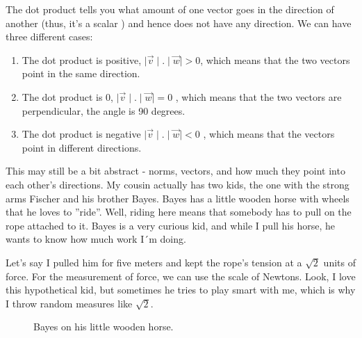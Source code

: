 \documentclass[600paper, 11pt,twoside,openany]{kdp}
\begin{document}
\indent The dot product tells you what amount of one vector goes in the direction of another (thus, it’s a scalar ) and hence does not have any direction. We can have three different cases: 
\begin{tcolorbox}
\begin{enumerate}
\item The dot product is positive,  $\mid \overrightarrow{v} \mid.\mid \overrightarrow{w}\mid>0$, which means that the two vectors point in the same direction.
\item The dot product is 0,  $\mid \overrightarrow{v} \mid.\mid \overrightarrow{w}\mid = 0$  , which means that the two vectors are perpendicular, the angle is 90 degrees.
\item The dot product is negative  $\mid \overrightarrow{v} \mid.\mid \overrightarrow{w}\mid<0$ , which means that the vectors point in different directions.
\end{enumerate}
\end{tcolorbox}
This may still be a bit abstract - norms, vectors, and how much they point into each other’s directions. My cousin actually has two kids, the one with the strong arms Fischer and his brother Bayes. Bayes has a little wooden horse with wheels that he loves to ”ride”. Well, riding here means that somebody has to pull on the rope attached to it. Bayes is a very curious kid, and while I pull his horse, he wants to know how much work I´m doing.
\par 
\vspace{-3pt}
\indent
Let's say I pulled him for five meters and kept the rope's tension at a $\sqrt{2}$ units of force. For the measurement of force, we can use the scale of Newtons. Look, I love this hypothetical kid, but sometimes he tries to play smart with me, which is why I throw random measures like $\sqrt{2}$.

\begin{figure}[!htbp]
\begin{center}
\end{center}
\caption{Bayes on his little wooden horse.}
\end{figure}
\end{document}
